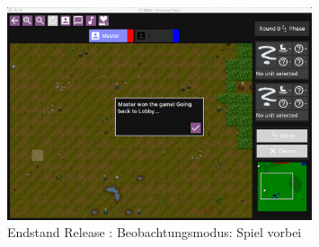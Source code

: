 \documentclass[12pt, titlepage]{scrartcl}
\newcommand{\RN}[1]{%
	\textup{\uppercase\expandafter{\romannumeral#1}}%
}
\begin{document}
				\begin{figure}[H] 
					\centering
					\includegraphics[width=0.8\textwidth]{images/endOfRelease/SpectatorEnd.png}
					\caption{Endstand Release \RN{3}: Beobachtungsmodus: Spiel vorbei}
					\label{End_Spectator_End}
				\end{figure}
\end{document}
